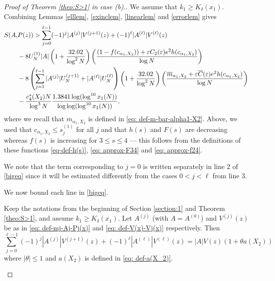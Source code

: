 \documentclass[12pt]{amsart}
\begin{document}
\begin{proof}[Proof of Theorem \ref{theo:S>1} in case (b).]
We assume that $k_1\ge K_{\delta}(x_1)$.
Combining Lemmas \ref{elllem}, \ref{exinclem}, \ref{linearlem} and \ref{errorlem} gives
\begin{align}
    S(A,&P(z))>\sum_{j=0}^{\ell-1}(-1)^j|A^{(j)}|V^{(j+1)}(z)+(-1)^{\ell}|A^{(\ell)}|V^{(\ell)}(z)\notag\\
    &-8U_N^{(1)}|A|\left(1+\frac{32.02}{\log^2 N}\right)\left(\frac{(1-f(c_{\alpha_1,X_2}))+\varepsilon C_2(\varepsilon)e^2h(c_{\alpha_1,X_2})}{\log N}\right)\notag\\
    &-8\left(\sum_{j=1}^{\ell-1}|A^{(j)}|U_N^{(j+1)}+|A^{(\ell)}|U_N^{(\ell)}\right)\left(1+\frac{32.02}{\log^2N}\right)\left(\frac{\overline{m}_{\alpha_1,X_2}+\varepsilon \overline{C}(\varepsilon)e^2h(c_{\alpha_1,X_2})}{\log N}\right)\notag\\
    &-\frac{c_4^*(X_2)N}{\log^3N}\frac{1.3841\log(\log^{10}x_1(N))}{\log\log(\log^{10}x_1(N))},\label{bigeq}
\end{align}
where we recall that $\overline{m}_{\alpha_1,X_2}$ is defined in \eqref{eq: def-m-bar-alpha1-X2}. Above, we used that $c_{\alpha_1, X_2} \le s^{(1)}_j$ for all $j$ and that $h(s)$ and $F(s)$ are decreasing whereas $f(s)$ is increasing for $3 \le s \le 4$ --- this follows from the definitions of these functions \eqref{eq-def-h(s)}, \eqref{eq: approx-F34} and \eqref{eq: approx-f24}.

We note that the term corresponding to $j = 0$ is written separately in line 2 of \eqref{bigeq} since it will be estimated differently from the cases $0 < j < \ell$ from line 3. 

We now bound each line in \eqref{bigeq}.

\begin{lemma} \label{lem: new-case-b-main}
Keep the notations from the beginning of Section \ref{section:1} and Theorem \ref{theo:S>1}, and assume $k_1 \ge K_{\delta}(x_1)$.
Let $A^{(j)}$ (with $A = A^{(0)}$) and $V^{(j)}(z)$ be as in \eqref{eq: def-mj-Aj-Pj(x)} and \eqref{eq: def-V(x)-Vj(x)} respectively. Then
\begin{equation}\label{firstlineeq}
    \sum_{j=0}^{\ell-1}(-1)^j|A^{(j)}|V^{(j+1)}(z)+(-1)^{\ell}|A^{(\ell)}|V^{(\ell)}(z)=|A|V(z)\left(1+\theta a(X_2)\right)
\end{equation}
where $|\theta|\le 1$ and $a(X_2)$ is defined in \eqref{eq: def-a(X_2)}.
\end{lemma}


\end{proof}
\end{document}
